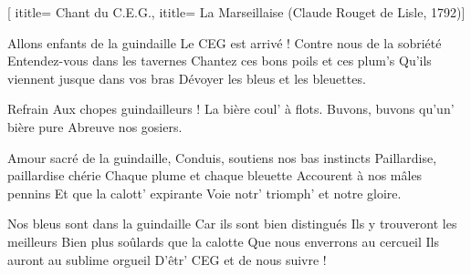  [
ititle= {Chant du C.E.G.},
ititle= {La Marseillaise (Claude Rouget de Lisle, 1792)}]

\beginverse
Allons enfants de la guindaille
Le CEG est arrivé !
Contre nous de la sobriété
Entendez-vous dans les tavernes
Chantez ces bons poils et ces plum's
Qu'ils viennent jusque dans vos bras
Dévoyer les bleus et les bleuettes.
\endverse

\beginchorus
Refrain
Aux chopes guindailleurs !
La bière coul' à flots.
Buvons, buvons qu'un' bière pure
Abreuve nos gosiers.
\endchorus

\beginverse
Amour sacré de la guindaille,
Conduis, soutiens nos bas instincts
Paillardise, paillardise chérie
Chaque plume et chaque bleuette
Accourent à nos mâles pennins
Et que la calott' expirante
Voie notr' triomph' et notre gloire.
\endverse

\beginverse
Nos bleus sont dans la guindaille
Car ils sont bien distingués
Ils y trouveront les meilleurs
Bien plus soûlards que la calotte
Que nous enverrons au cercueil
Ils auront au sublime orgueil
D'êtr' CEG et de nous suivre !
\endverse

\endsong
